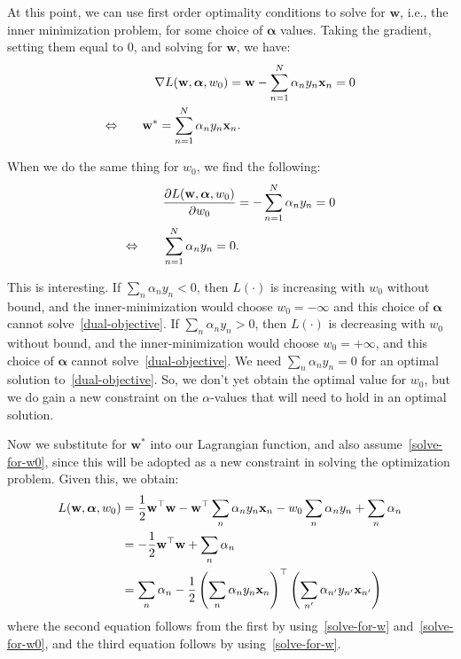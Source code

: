       At this point, we can use first order optimality conditions to  solve
      for  $\mathbf{w}$, i.e., the inner minimization problem, for some choice of  $\boldsymbol{\alpha}$ values.
      Taking the gradient, setting them equal to 0, and solving for $\textbf{w}$, we have:
\begin{align}
  & \quad \nabla L(\textbf{w},  \boldsymbol{\alpha},w_0)= \textbf{w} - \sum_{n=1}^{N} \alpha_{n} y_{n} \textbf{x}_{n} = 0
  \notag  \\
\Leftrightarrow \quad\quad &	\textbf{w}^{*} = \sum_{n=1}^{N} \alpha_{n} y_{n} \textbf{x}_{n}. \label{solve-for-w}
\end{align}

When we do the same thing for $w_{0}$, we find the following:
\begin{align}
\quad &	\frac{\partial L(\textbf{w},  \boldsymbol{\alpha},w_0)}{\partial w_{0}} = - \sum_{n=1}^{N} \alpha_{n} y_{n} = 0 \notag\\
\Leftrightarrow
\quad\quad & 	\sum_{n=1}^{N} \alpha_{n} y_{n} = 0. \label{solve-for-w0}
        \end{align}

        This is interesting. If $\sum_n \alpha_n y_n< 0$, then $L(\cdot)$ is increasing with $w_0$ without bound, and the inner-minimization would choose $w_0=-\infty$ and this choice of $\boldsymbol{\alpha}$  cannot solve~\eqref{dual-objective}.
        If $\sum_n \alpha_n y_n> 0$, then $L(\cdot)$ is decreasing with $w_0$ without bound, and the inner-minimization would choose $w_0=+\infty$, and this
        choice of $\boldsymbol{\alpha}$ cannot solve~\eqref{dual-objective}.
        We need $\sum_n \alpha_n y_n= 0$ for an optimal solution to~\eqref{dual-objective}.  So, we don't yet obtain the optimal value for $w_0$,
        but we do gain a new constraint on the $\alpha$-values that will need to hold in an optimal solution.
        
        Now we substitute for $\mathbf{w}^*$   into our Lagrangian function, and also assume~\eqref{solve-for-w0},  since this will be adopted as a new constraint in solving the optimization problem.
        Given this, we obtain:
\begin{align} 
          L(\textbf{w}, \boldsymbol{\alpha},w_0) &=
\frac{1}{2}\mathbf{w}^\top \mathbf{w} - \mathbf{w}^\top\sum_n \alpha_ny_n{\mathbf x}_n-w_0\sum_n\alpha_ny_n+\sum_n\alpha_n
  \notag \\
                                                 &=-\frac{1}{2}\mathbf{w}^\top\mathbf{w}+\sum_n\alpha_n\notag \\
                                                 &=\sum_n\alpha_n-\frac{1}{2}\left(\sum_n\alpha_ny_n{\mathbf x}_n\right)^\top\left(\sum_{n'}\alpha_{n'}y_{n'}\mathbf{x}_{n'}\right) \label{plugged-in-lagrangian}
\end{align}
%
where the second equation follows from the first by using~\eqref{solve-for-w} and~\eqref{solve-for-w0}, and the third equation follows by  using~\eqref{solve-for-w}.
%


